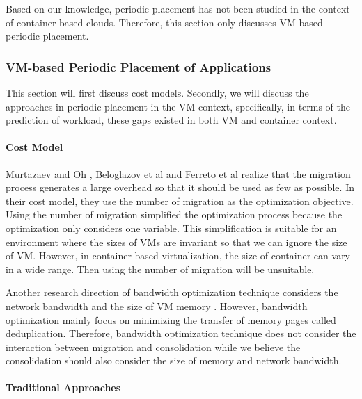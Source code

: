 Based on our knowledge, periodic placement has not been studied in the context of container-based clouds. 
Therefore, this section only discusses VM-based periodic placement.

\subsubsection{VM-based Periodic Placement of Applications}
This section will first discuss cost models. Secondly, we will discuss the approaches in periodic placement in the VM-context, specifically, in terms of the prediction of workload, these gaps existed in both VM and container context. 

\paragraph{Cost Model}
Murtazaev and Oh \cite{Murtazaev:2014eo}, Beloglazov et al \cite{Beloglazov:2012ji} and Ferreto et al \cite{Ferreto:2011iia} realize that the migration process generates a large overhead so that it should be used as few as possible. In their cost model, they use the number of migration as the optimization objective. Using the number of migration simplified the optimization process because the optimization only considers one variable. This simplification is suitable for an environment where the sizes of VMs are invariant so that we can ignore the size of VM. However, in container-based virtualization, the size of container can vary in a wide range. Then using the number of migration will be unsuitable.

Another research direction of  bandwidth optimization technique considers the network bandwidth and the size of VM memory \cite{Deshpande:2012jf, Gerofi:2013bd}. However, bandwidth optimization mainly focus on minimizing the transfer of memory pages called deduplication. Therefore, bandwidth optimization technique does not consider the interaction between migration and consolidation while we believe the consolidation should also consider the size of memory and network bandwidth.

\paragraph{Traditional Approaches}

